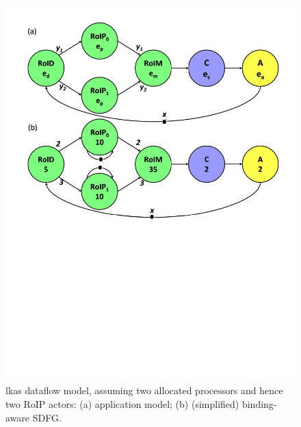 \begin{figure}
    \centering
    \includegraphics[scale=0.375]{images/sadf.pdf}
    \vspace{-14em}
    \caption{\Gls{lkas} dataflow model, assuming two allocated processors and hence two RoIP actors: (a) application model; (b) (simplified) binding-aware SDFG.}
    \label{fig:ch5_SADF}
\end{figure}

